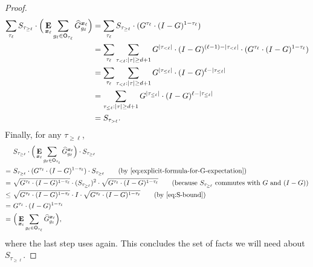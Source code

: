 \begin{proof}
\begin{align}
\sum_{\tau_{\ell}} 
	S_{\tau_{\geq \ell}} \cdot \Big(\mathop{\bf E\/}_{{\boldsymbol{x}}_{\ell}} \sum_{g_{\ell} \in \mathsf{O}_{\tau_{\ell}}} \widehat{G}^{{\boldsymbol{x}}_{\ell}}_{g_{\ell}}\Big)
&= \sum_{\tau_{\ell}}  S_{\tau_{\geq \ell}} \cdot(G^{\tau_{\ell}} \cdot (I - G)^{1 - \tau_{\ell}})\nonumber\\
&= \sum_{\tau_{\ell}}  \sum_{\tau_{< \ell} : |\tau| \geq d+1} G^{|\tau_{<\ell}|}\cdot (I-G)^{(\ell-1)-|\tau_{<\ell}|}
	\cdot (G^{\tau_{\ell}} \cdot (I - G)^{1 - \tau_{\ell}})\nonumber\\
&= \sum_{\tau_{\ell}}  \sum_{\tau_{< \ell} : |\tau| \geq d+1} G^{|\tau_{\leq \ell}|}\cdot (I-G)^{\ell-|\tau_{\leq\ell}|}\nonumber\\
&= \sum_{\tau_{\leq \ell} : |\tau| \geq d+1} G^{|\tau_{\leq \ell}|}\cdot (I-G)^{\ell-|\tau_{\leq\ell}|}\nonumber\\
&= S_{\tau_{> \ell}}.\label{eq:S-recurrence}
\end{align}
Finally, for any $\tau_{\geq \ell}$,
\begin{align}
&S_{\tau_{\geq \ell}}
	\cdot \Big(\E_{\bx_{\ell}} \sum_{g_{\ell} \in \sfO_{\tau_{\ell}}} \wG^{\bx_{\ell}}_{g_{\ell}}\Big)
	\cdot S_{\tau_{\geq \ell}}\nonumber\\
 =~& S_{\tau_{\geq \ell}}
	\cdot (G^{\tau_{\ell}} \cdot (I - G)^{1 - \tau_{\ell}})
	\cdot S_{\tau_{\geq \ell}} \tag{by \Cref{eq:explicit-formula-for-G-expectation}}\\
 =~& \sqrt{G^{\tau_{\ell}} \cdot (I - G)^{1 - \tau_{\ell}}} \cdot (S_{\tau_{\geq \ell}})^2
	\cdot \sqrt{G^{\tau_{\ell}} \cdot (I - G)^{1 - \tau_{\ell}}}\tag{because $S_{\tau_{\geq \ell}}$ commutes with $G$ and $(I-G)$}\\
\leq~& \sqrt{G^{\tau_{\ell}} \cdot (I - G)^{1 - \tau_{\ell}}} \cdot I
	\cdot \sqrt{G^{\tau_{\ell}} \cdot (I - G)^{1 - \tau_{\ell}}} \tag{by \Cref{eq:S-bound}}\\
=~& G^{\tau_{\ell}} \cdot (I - G)^{1 - \tau_{\ell}}\nonumber\\
=~& \Big(\E_{\bx_{\ell}} \sum_{g_{\ell} \in \sfO_{\tau_{\ell}}} \wG^{\bx_{\ell}}_{g_{\ell}}\Big), \label{eq:S-sandwich}
\end{align}
where the last step uses  again.
This concludes the set of facts we will need about $S_{\tau_{\geq \ell}}$.


\end{proof}
